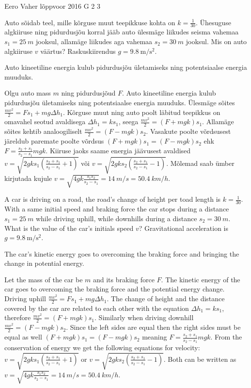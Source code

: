 {Eero Vaher} %
{lõppvoor} %
{2016} %
{G 2} %
{3} %
{
\ifStatement
Auto sõidab teel, mille kõrguse muut teepikkuse kohta on $k=\frac{1}{30}$. Ühesuguse algkiiruse ning pidurdusjõu korral jääb auto ülesmäge liikudes seisma vahemaa $s_1=\SI{25}{m}$ jooksul, allamäge liikudes aga vahemaa $s_2=\SI{30}{m}$ jooksul. Mis on auto algkiiruse $v$ väärtus? Raskuskiirendus $g=\SI{9.8}{\meter\per\second\squared}$.
\fi


\ifHint
Auto kineetiline energia kulub pidurdusjõu ületamiseks ning potentsiaalse energia muuduks.
\fi


\ifSolution
Olgu auto mass $m$ ning pidurdusjõud $F$. Auto kineetiline energia kulub pidurdusjõu ületamiseks ning potentsiaalse energia muuduks. Ülesmäge sõites $\frac{mv^2}{2}=Fs_1+mg\Delta h_1$. Kõrguse muut ning auto poolt läbitud teepikkus on omavahel seotud avaldisega $\Delta h_1=ks_1$, seega $\frac{mv^2}{2}=\left(F+mgk\right)s_1$. Allamäge sõites kehtib analoogiliselt $\frac{mv^2}{2}=\left(F-mgk\right)s_2$. Vasakute poolte võrdsusest järeldub paremate poolte võrdsus $\left(F+mgk\right)s_1=\left(F-mgk\right)s_2$ ehk $F=\frac{s_2+s_1}{s_2-s_1}mgk$. Kiiruse jaoks saame energia jäävusest avaldised  $v=\sqrt{2gks_1\left(\frac{s_2+s_1}{s_2-s_1}+1\right)}$ või $v=\sqrt{2gks_2\left(\frac{s_2+s_1}{s_2-s_1}-1\right)}$. Mõlemad saab ümber kirjutada kujule $v=\sqrt{4gk\frac{s_1s_2}{s_2-s_1}}=\SI{14}{m \per s}=\SI{50.4}{km \per h}$.
\fi


\ifEngStatement
A car is driving on a road, the road’s change of height per toad length is $k=\frac{1}{30}$. With a same initial speed and braking force the car stops during a distance $s_1=\SI{25}{m}$ while driving uphill, while downhills during a distance $s_2=\SI{30}{m}$. What is the value of the car’s initials speed $v$? Gravitational acceleration is $g=\SI{9.8}{\meter\per\second\squared}$.
\fi


\ifEngHint
The car’s kinetic energy goes to overcoming the braking force and bringing the change in potential energy.
\fi


\ifEngSolution
Let the mass of the car be $m$ and its braking force $F$. The kinetic energy of the car goes to overcoming the braking force and the potential energy change. Driving uphill $\frac{mv^2}{2}=Fs_1+mg\Delta h_1$. The change of height and the distance covered by the car are related to each other with the equation $\Delta h_1=ks_1$, therefore $\frac{mv^2}{2}=\left(F+mgk\right)s_1$. Similarly when driving downhill $\frac{mv^2}{2}=\left(F-mgk\right)s_2$. Since the left sides are equal then the right sides must be equal as well $\left(F+mgk\right)s_1=\left(F-mgk\right)s_2$ meaning $F=\frac{s_2+s_1}{s_2-s_1}mgk$. From the conservation of energy we get the following equations for velocity: $v=\sqrt{2gks_1\left(\frac{s_2+s_1}{s_2-s_1}+1\right)}$ or $v=\sqrt{2gks_2\left(\frac{s_2+s_1}{s_2-s_1}-1\right)}$. Both can be written as $v=\sqrt{4gk\frac{s_1s_2}{s_2-s_1}}=\SI{14}{m \per s}=\SI{50.4}{km \per h}$.
\fi
}